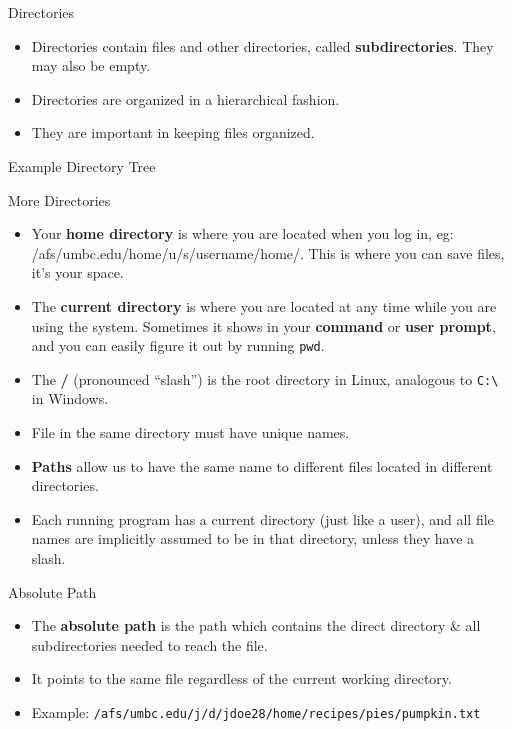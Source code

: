 \documentclass[graphics]{beamer}
\begin{document}
\begin{frame}{Directories}
    \begin{itemize}
        \item Directories contain files and other directories, called \textbf{subdirectories}. They may also be empty.
        \item Directories are organized in a hierarchical fashion.
        \item They are important in keeping files organized.
    \end{itemize}
\end{frame}

\begin{frame}{Example Directory Tree}
    
\end{frame}

\begin{frame}{More Directories}
    \begin{itemize}
        \item Your \textbf{home directory} is where you are located when you log in, eg: /afs/umbc.edu/home/u/s/username/home/. This is where you can save files, it's your space.
        \item The \textbf{current directory} is where you are located at any time while you are using the system. Sometimes it shows in your \textbf{command} or \textbf{user prompt}, and you can easily figure it out by running \texttt{pwd}.
        \item The \textbf{/} (pronounced ``slash'') is the root directory in Linux, analogous to \texttt{C:\textbackslash} in Windows.
        \item File in the same directory must have unique names.
        \item \textbf{Paths} allow us to have the same name to different files located in different directories.
        \item Each running program has a current directory (just like a user), and all file names are implicitly assumed to be in that directory, unless they have a slash.
    \end{itemize}
\end{frame}

\begin{frame}{Absolute Path}
    \begin{itemize}
        \item The \textbf{absolute path} is the path which contains the direct directory \& all subdirectories needed to reach the file.
        \item It points to the same file regardless of the current working directory.
        \item Example: \texttt{/afs/umbc.edu/j/d/jdoe28/home/recipes/pies/pumpkin.txt}
    \end{itemize}
\end{frame}
\end{document}
